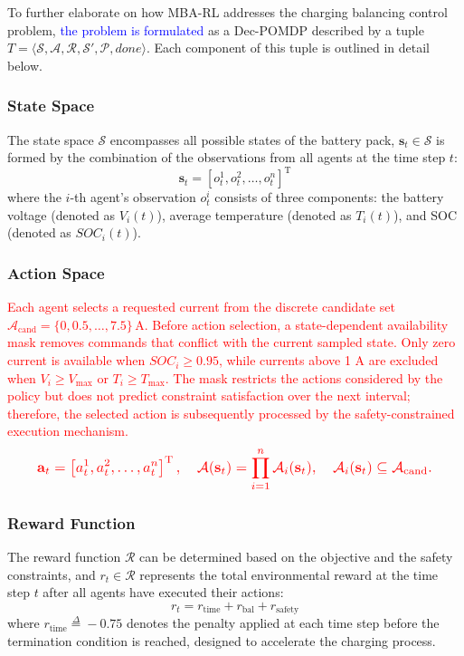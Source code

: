 \documentclass[journal]{IEEEtran}
\newcommand{\rev}[1]{\textcolor{blue}{#1}}
\newcommand{\newrev}[1]{\textcolor{red}{#1}}
\begin{document}
To further elaborate on how MBA-RL addresses the charging balancing control problem, \rev{the problem is formulated} as a Dec-POMDP \cite{27} described by a tuple \(T = \langle\mathcal{S}, \mathcal{A}, \mathcal{R}, \mathcal{S'}, \mathcal{P}, done\rangle\). Each component of this tuple is outlined in detail below.

\subsubsection{State Space} The state space $\mathcal{S}$ encompasses all possible states of the battery pack, $\mathbf{s}_t \in \mathcal{S}$ is formed by the combination of the observations from all agents at the time step $t$:
\begin{equation}
   \mathbf{s}_t = \left[ o_t^1, o_t^2, \dots, o_t^n \right]^{\mathrm{T}}
\end{equation}
where the $i$-th agent’s observation $o_t^i$ consists of three components: the battery voltage (denoted as $V_i(t)$), average temperature (denoted as $T_i(t)$), and SOC (denoted as $SOC_i(t)$).

\subsubsection{Action Space} \newrev{Each agent selects a requested current from the discrete candidate set $\mathcal{A}_{\mathrm{cand}}=\{0,0.5,\ldots,7.5\}\,\mathrm{A}$. Before action selection, a state-dependent availability mask removes commands that conflict with the current sampled state. Only zero current is available when $SOC_i\geq0.95$, while currents above 1 A are excluded when $V_i\geq V_{\max}$ or $T_i\geq T_{\max}$. The mask restricts the actions considered by the policy but does not predict constraint satisfaction over the next interval; therefore, the selected action is subsequently processed by the safety-constrained execution mechanism.}
\begingroup
\setlength{\abovedisplayskip}{3pt}
\setlength{\belowdisplayskip}{3pt}
\begin{equation}
\newrev{\resizebox{0.91\columnwidth}{!}{$\displaystyle
\mathbf{a}_t=\left[a_t^1,a_t^2,\dots,a_t^n\right]^{\mathrm{T}},\quad
\mathcal{A}(\mathbf{s}_t)=\prod_{i=1}^{n}\mathcal{A}_i(\mathbf{s}_t),\quad
\mathcal{A}_i(\mathbf{s}_t)\subseteq\mathcal{A}_{\mathrm{cand}}.$}}
\end{equation}
\endgroup
\subsubsection{Reward Function} The reward function $\mathcal{R}$ can be determined based on the objective and the safety constraints, and $r_t \in \mathcal{R}$ represents the total environmental reward at the time step $t$ after all agents have executed their actions:
\begin{equation}
    r_t = r_{\text{time}} + r_{\text{bal}} + r_{\text{safety}}
\end{equation}
where $r_{\text{time}} \stackrel{\Delta}{=} -0.75$ denotes the penalty applied at each time step before the termination condition is reached, designed to accelerate the charging process.
\end{document}

